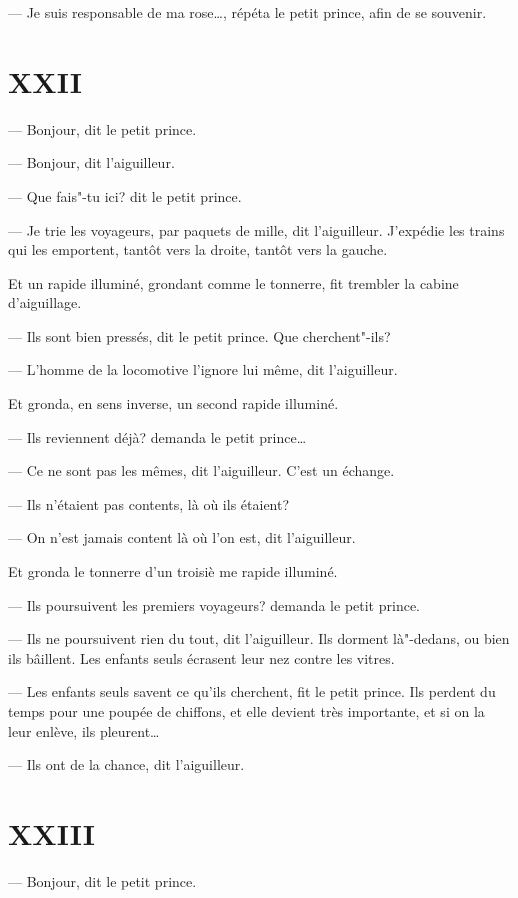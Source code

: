 \begin{Parallel}[p]{}{}
{--- Je suis responsable de ma rose\ldots{}, répéta le
petit prince, afin de se souvenir.

\section{XXII}

--- Bonjour, dit le petit prince.

--- Bonjour, dit l'aiguilleur.

--- Que fais"-tu ici? dit le petit prince.

--- Je trie les voyageurs, par paquets de mille, dit l'aiguilleur. J'expédie les
trains qui les emportent, tantôt vers la droite, tantôt vers la gauche.

Et un rapide illuminé, grondant comme le tonnerre, fit trembler la cabine d'aiguillage.

--- Ils sont bien pressés, dit le petit prince. Que cherchent"-ils?

--- L'homme de la locomotive l'ignore lui même, dit l'aiguilleur.

Et gronda, en sens inverse, un second rapide illuminé.

--- Ils reviennent déjà? demanda le petit prince\ldots{}

--- Ce ne sont pas les mêmes, dit l'aiguilleur. C'est un échange.

--- Ils n'étaient pas contents, là où ils étaient?

--- On n'est jamais content là où l'on est, dit l'aiguilleur.

Et gronda le tonnerre d'un troisiè me rapide illuminé.

--- Ils poursuivent les premiers voyageurs? demanda le petit prince.

--- Ils ne poursuivent rien du tout, dit l'aiguilleur. Ils dorment là"-dedans, ou bien ils bâillent. Les enfants seuls écrasent leur nez contre les vitres.

--- Les enfants seuls savent ce qu'ils cherchent, fit le petit prince. Ils perdent du temps pour une poupée de chiffons, et elle devient très importante, et si on la leur enlève, ils pleurent\ldots{}

--- Ils ont de la chance, dit l'aiguilleur.

\section{XXIII}

--- Bonjour, dit le petit prince.

}
\end{Parallel}
